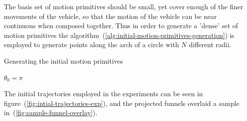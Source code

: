 The basis set of motion primitives should be small, yet cover enough of the
finer movements of the vehicle, so that the motion of the vehicle can be near
continuous when composed together. Thus in order to generate a 'dense' set of
motion primitives the algorithm~(\ref{alg:initial-motion-primitives-generation})
is employed to generate points along the arch of a circle with \(N\) different
radii.


\begin{algorithm}[H]
  \label{alg:initial-motion-primitives-generation}
  \caption{Generating the initial motion primitives}
  \DontPrintSemicolon \SetAlgoNoLine

   

  \(\theta_{0} = \pi\) \;

  \;
\end{algorithm}

The initial trajectories employed in the experiments can be seen in
figure~(\ref{fig:intial-trajectories-exp}), and the projected funnels overlaid a
sample in~(\ref{fig:sample-funnel-overlay}).

